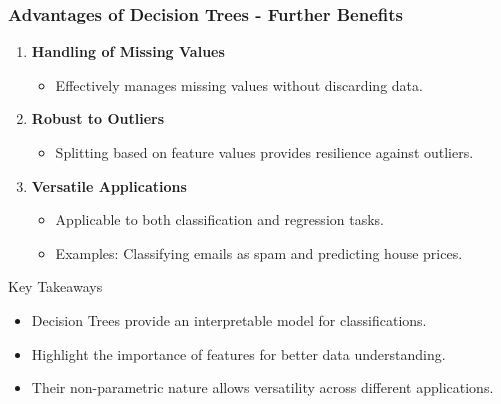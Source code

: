 \documentclass[aspectratio=169]{beamer}
\begin{document}
\begin{frame}[fragile]
    \frametitle{Advantages of Decision Trees - Further Benefits}
    \begin{enumerate}[resume]
        \item \textbf{Handling of Missing Values}
        \begin{itemize}
            \item Effectively manages missing values without discarding data.
        \end{itemize}

        \item \textbf{Robust to Outliers}
        \begin{itemize}
            \item Splitting based on feature values provides resilience against outliers.
        \end{itemize}

        \item \textbf{Versatile Applications}
        \begin{itemize}
            \item Applicable to both classification and regression tasks.
            \item Examples: Classifying emails as spam and predicting house prices.
        \end{itemize}
    \end{enumerate}
    
    \begin{block}{Key Takeaways}
        \begin{itemize}
            \item Decision Trees provide an interpretable model for classifications.
            \item Highlight the importance of features for better data understanding.
            \item Their non-parametric nature allows versatility across different applications.
        \end{itemize}
    \end{block}
\end{frame}
\end{document}
